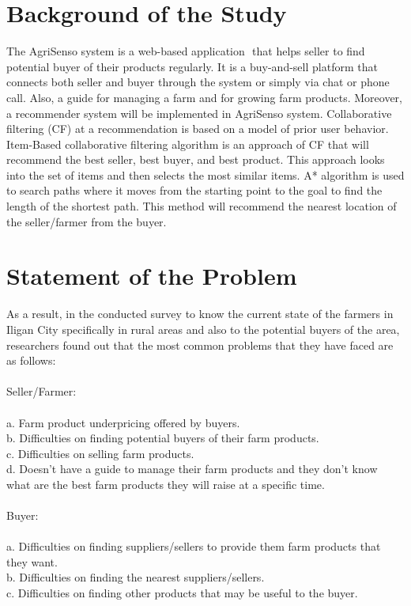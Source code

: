 \documentclass{report}
\begin{document}
\section{Background of the Study}
The AgriSenso system is a web-based application ​ that helps seller to find potential buyer of
their products regularly. It is a buy-and-sell platform that connects both seller and buyer
through the system or simply via chat or phone call. Also, a guide for managing a farm and for
growing farm products.
Moreover, a recommender system will be implemented in AgriSenso system. Collaborative
filtering (CF) at a recommendation is based on a model of prior user behavior. Item-Based
collaborative filtering algorithm is an approach of CF that will recommend the best seller, best
buyer, and best product. This approach looks into the set of items and then selects the most
similar items. A* algorithm is used to search paths where it moves from the starting point to
the goal to find the length of the shortest path. This method will recommend the nearest
location of the seller/farmer from the buyer. 

\section{Statement of the Problem}
As a result, in the conducted survey to know the current state of the farmers in Iligan City
specifically in rural areas and also to the potential buyers of the area, researchers found out
that the most common problems that they have faced are as follows:\\ \\
Seller/Farmer:\\ \\
a. Farm product underpricing offered by buyers.\\
b. Difficulties on finding potential buyers of their farm products.\\
c. Difficulties on selling farm products.\\
d. Doesn't have a guide to manage their farm products and they don't know what are the
best farm products they will raise at a specific time.\\ \\
Buyer:\\ \\
a. Difficulties on finding suppliers/sellers to provide them farm products that they want.\\
b. Difficulties on finding the nearest suppliers/sellers.\\
c. Difficulties on finding other products that may be useful to the buyer.\\
\end{document}
